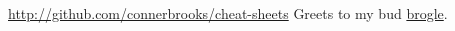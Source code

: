 \documentclass[10pt,landscape]{article}
\begin{document}
\begin{multicols}{3}

\href{http://github.com/connerbrooks/cheat-sheets}{http://github.com/connerbrooks/cheat-sheets}
\newline
Greets to my bud \href{http://github.com/broglea}{brogle}.

\end{multicols}
\end{document}
